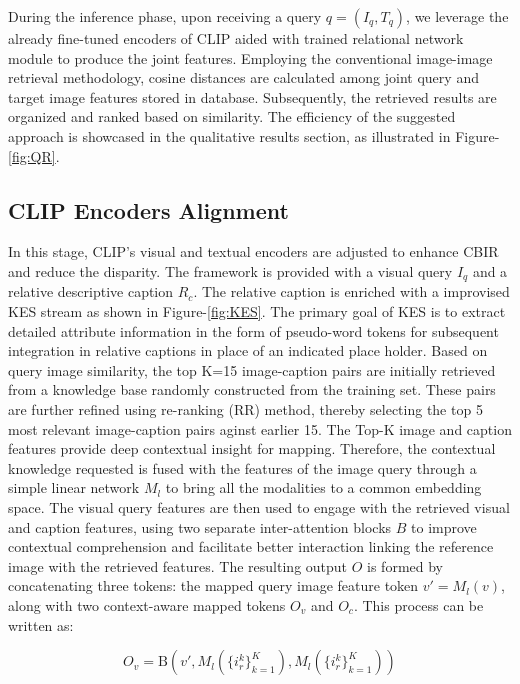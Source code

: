 \documentclass[10pt,lineno]{wlpeerj}
\begin{document}
During the inference phase, upon receiving a query $q = (I_q, T_q)$, we leverage the already fine-tuned encoders of CLIP aided with trained relational network module to produce the joint features. Employing the conventional image-image retrieval methodology, cosine distances are calculated among joint query and target image features stored in database. Subsequently, the retrieved results are organized and ranked based on similarity. The efficiency of the suggested approach is showcased in the qualitative results section, as illustrated in Figure-\ref{fig:QR}.

\subsection*{CLIP Encoders Alignment}\label{sec:Clip_Encoders}
In this stage, CLIP's visual and textual encoders are adjusted to enhance CBIR and reduce the disparity. The framework is provided with a visual query $I_q$ and a relative descriptive caption $R_c$. The relative caption is enriched with a improvised KES stream  as shown in Figure-\ref{fig:KES}. The primary goal of KES is to extract detailed attribute information in the form of pseudo-word tokens for subsequent integration in relative captions in place of an indicated place holder. Based on query image similarity, the top K=15 image-caption pairs are initially retrieved from a knowledge base randomly constructed from the training set. These pairs are further refined using re-ranking (RR) method, thereby selecting the top 5 most relevant image-caption pairs aginst earlier 15. The Top-K image and caption features provide deep contextual insight for mapping. Therefore, the contextual knowledge requested is fused with the features of the image query through a simple linear network $M_l$ to bring all the modalities to a common embedding space. The visual query features are then used to engage with the retrieved visual and caption features, using two separate inter-attention blocks $B$ to improve contextual comprehension and facilitate better interaction linking the reference image with the retrieved features. 
The resulting output $O$ is formed by concatenating three tokens: the mapped query image feature token $v' = M_l(v)$, along with two context-aware mapped tokens $O_v$ and $O_c$. This process can be written as:

\begin{equation}
    O_v = \text{B}(v', M_l(\{i_r^k\}_{k=1}^K), M_l(\{i_r^k\}_{k=1}^K))
\label{eq:vi}
\end{equation}
\end{document}
